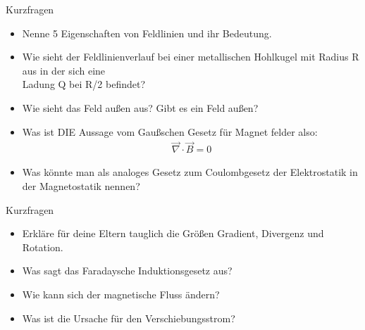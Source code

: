 \begin{frame}{Kurzfragen}
    \begin{itemize}
        \item Nenne 5 Eigenschaften von Feldlinien und ihr Bedeutung.
        \item <2-> Wie sieht der Feldlinienverlauf bei einer metallischen Hohlkugel mit Radius R aus in der sich eine\\
        Ladung Q bei R/2 befindet? 
        \item <3-> Wie sieht das Feld außen aus? Gibt es ein Feld außen?
        \item <4-> Was ist DIE Aussage vom Gaußschen Gesetz für Magnet felder also:
        \begin{align*}
            \vec{\nabla} \cdot \vec{B} = 0
        \end{align*}
        \item <4-> Was könnte man als analoges Gesetz zum Coulombgesetz der Elektrostatik in der Magnetostatik nennen?
    \end{itemize}
    
\end{frame}\begin{frame}{Kurzfragen}
    \begin{itemize}
        \item Erkläre für deine Eltern tauglich die Größen Gradient, Divergenz und Rotation. 
        \item <2-> Was sagt das Faradaysche Induktionsgesetz aus?
        \item <3-> Wie kann sich der magnetische Fluss ändern?
        \item <4-> Was ist die Ursache für den Verschiebungsstrom?       
    \end{itemize}    
\end{frame}

